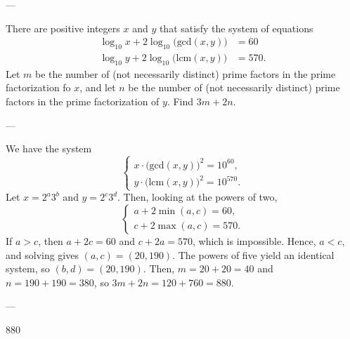 
---

There are positive integers $x$ and $y$ that satisfy the system of equations
\begin{align*}
    \log_{10}x+2\log_{10}\big(\text{gcd}(x,y)\big)&=60\\
    \log_{10}y+2\log_{10}\big(\text{lcm}(x,y)\big)&=570.
\end{align*}
Let $m$ be the number of (not necessarily distinct) prime factors in the prime factorization fo $x$, and let $n$ be the number of (not necessarily distinct) prime factors in the prime factorization of $y$. Find $3m+2n$.

---

We have the system \[\begin{cases}x\cdot\big(\text{gcd}(x,y)\big)^2=10^{60},\\ y\cdot\big(\text{lcm}(x,y)\big)^2=10^{570}.\end{cases}\]
Let $x=2^a3^b$ and $y=2^c3^d$. Then, looking at the powers of two, \[\begin{cases}a+2\min(a,c)=60,\\ c+2\max(a,c)=570.\end{cases}\]
If $a>c$, then $a+2c=60$ and $c+2a=570$, which is impossible. Hence, $a<c$, and solving gives $(a,c)=(20,190)$. The powers of five yield an identical system, so $(b,d)=(20,190)$. Then, $m=20+20=40$ and $n=190+190=380$, so $3m+2n=120+760=880$.

---

880
